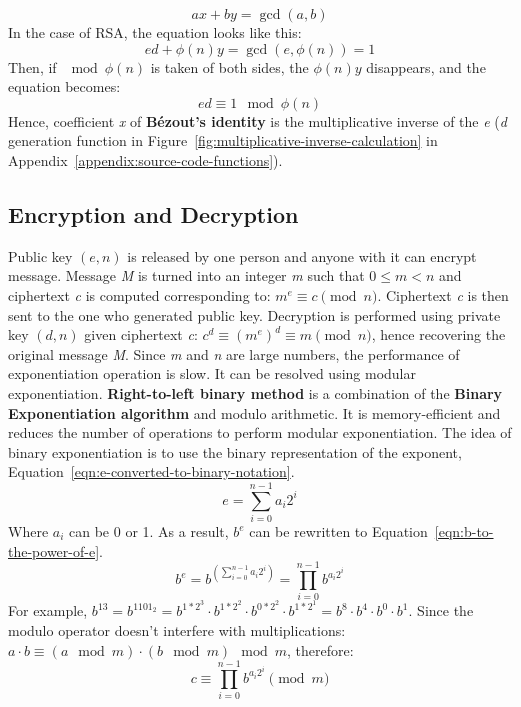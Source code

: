 \documentclass[11 pt]{article}
\begin{document}
\begin{equation}
    ax+by=\gcd(a,b)
\end{equation}
In the case of RSA, the equation looks like this:
\begin{equation}
    ed+\phi(n)y=\gcd(e, \phi(n))=1
\end{equation}
Then, if $\mod \phi(n)$ is taken of both sides, the $\phi(n)y$ disappears, and the equation becomes:
\begin{equation}
    ed \equiv 1 \mod \phi(n)
\end{equation}
Hence, coefficient \textit{x} of \textbf{Bézout's identity} is the multiplicative inverse of the \textit{e} (\textit{d} generation function in Figure~\ref{fig:multiplicative-inverse-calculation} in Appendix~\ref{appendix:source-code-functions}).

\subsection{Encryption and Decryption}
Public key $(e, n)$ is released by one person and anyone with it can encrypt message. Message \textit{M} is turned into an integer \textit{m} such that $0 \leq m < n$ and ciphertext \textit{c} is computed corresponding to: $m^{e} \equiv c \pmod{n}$. Ciphertext \textit{c} is then sent to the one who generated public key.
\newline
Decryption is performed using private key $(d,n)$ given ciphertext \textit{c}: $c^{d}\equiv (m^{e})^{d}\equiv m{\pmod {n}}$, hence recovering the original message \textit{M}.
\newline
Since \textit{m} and \textit{n} are large numbers, the performance of exponentiation operation is slow. It can be resolved using modular exponentiation. \textbf{Right-to-left binary method} \cite{Right-to-left binary method} is a combination of the \textbf{Binary Exponentiation algorithm} and modulo arithmetic. It is memory-efficient and reduces the number of operations to perform modular exponentiation. The idea of binary exponentiation is to use the binary representation of the exponent, Equation~\ref{eqn:e-converted-to-binary-notation}.
\begin{equation}
e=\sum _{i=0}^{n-1}a_{i}2^{i}
\label{eqn:e-converted-to-binary-notation}
\end{equation}
Where $a_{i}$ can be 0 or 1. As a result, $b^e$ can be rewritten to Equation~\ref{eqn:b-to-the-power-of-e}.
\begin{equation}
b^{e}=b^{\left(\sum _{i=0}^{n-1}a_{i}2^{i}\right)}=\prod _{i=0}^{n-1}b^{a_{i}2^{i}}
\label{eqn:b-to-the-power-of-e}
\end{equation}
For example, $b^{13}=b^{1101_{2}}=b^{1*2^3}⋅b^{1*2^2}⋅b^{0*2^2}⋅b^{1*2^1}=b^{8}⋅b^{4}⋅b^{0}⋅b^{1}$. Since the modulo operator doesn't interfere with multiplications: $a⋅b \equiv (a \mod m)⋅(b \mod m) \mod m$, therefore:
\begin{equation}
c \equiv \prod _{i=0}^{n-1}b^{a_{i}2^{i}}{\pmod {m}}
\label{eqn:modulo-exponentiation}
\end{equation}
\end{document}
